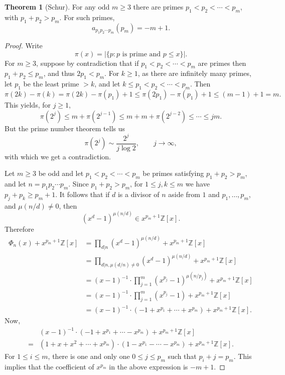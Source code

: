 \documentclass{article}
\theoremstyle{definition}
\newtheorem{theorem}{Theorem}
\theoremstyle{definition}
\begin{document}
\begin{theorem}[Schur]
For any odd $m \geq 3$ there are primes $p_1<p_2<\cdots<p_m$, with $p_1+p_2>p_m$.
For such primes,
\[
a_{p_1p_2\cdots p_m}(p_m) = -m+1.
\]
\end{theorem}
\begin{proof}
Write
\[
\pi(x) = |\{p: \textrm{$p$ is prime and $p \leq x$}\}|.
\]
For  $m \geq 3$, suppose by contradiction that if
$p_1<p_2<\cdots<p_m$ are primes then $p_1+p_2 \leq p_m$, and thus
$2p_1<p_m$.
For $k \geq 1$, 
as there are infinitely many primes, let $p_1$ be the least prime $> k$, and let
$k \leq p_1<p_2<\cdots<p_m$. 
Then
\[
\pi(2k)-\pi(k) = \pi(2k) - \pi(p_1) +1 \leq \pi(2p_1) - \pi(p_1) + 1
\leq (m-1)+1 = m.
\]
This yields, for $j \geq 1$,
\[
\pi(2^j) \leq m+\pi(2^{j-1}) \leq m+m+\pi(2^{j-2}) \leq 
\cdots \leq jm.
\]
But the prime number theorem tells us 
\[
\pi(2^j) \sim \frac{2^j}{j \log 2},\qquad j \to \infty,
\]
with which we get a contradiction. 

Let $m \geq 3$ be odd and let $p_1<p_2<\cdots<p_m$ be primes satisfying $p_1+p_2>p_m$,
and let $n=p_1  p_2 \cdots p_m$. Since $p_1+p_2>p_m$, for $1 \leq j,k \leq m$ we have $p_j+p_k \geq p_m+1$. 
It follows that if $d$ is a divisor of $n$ aside from $1$ and $p_1,\ldots,p_m$, and $\mu(n/d) \neq 0$, then
\[
(x^d-1)^{\mu(n/d)} \in x^{p_m+1} \mathbb{Z}[x].
\]
Therefore
\begin{align*}
\Phi_n(x)+x^{p_m+1} \mathbb{Z}[x]&=\prod_{d|n} (x^d-1)^{\mu(n/d)}+x^{p_m+1} \mathbb{Z}[x]\\
&=\prod_{d|n, \mu(d/n) \neq 0} (x^d-1)^{\mu(n/d)}+x^{p_m+1} \mathbb{Z}[x]\\
&=(x-1)^{-1} \cdot \prod_{j=1}^m (x^{p_j}-1)^{\mu(n/p_j)}+x^{p_m+1} \mathbb{Z}[x]\\
&=(x-1)^{-1} \cdot  \prod_{j=1}^m (x^{p_j}-1) +x^{p_m+1} \mathbb{Z}[x]\\
&=(x-1)^{-1} \cdot (-1+x^{p_1}+\cdots+x^{p_m}) +x^{p_m+1} \mathbb{Z}[x].
\end{align*}
Now,
\[
\begin{split}
&(x-1)^{-1} \cdot (-1+x^{p_1}+\cdots-x^{p_m}) +x^{p_m+1} \mathbb{Z}[x]\\
=&(1+x+x^2+\cdots+x^{p_m}) \cdot (1-x^{p_1}-\cdots-x^{p_m}) +x^{p_m+1} \mathbb{Z}[x].
\end{split}
\]
For $1 \leq i \leq m$, 
there is one and only one
$0 \leq j \leq p_m$ such that 
$p_i+j=p_m$. This implies that the coefficient of $x^{p_m}$ in the above expression is
$-m+1$. 
\end{proof}
\end{document}
